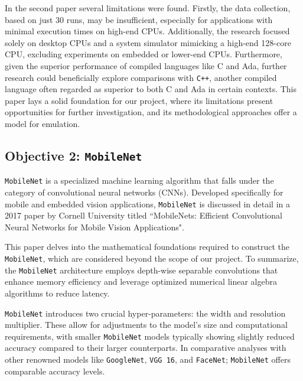 In the second paper\cite{mpbenchmark_paper} several limitations were found. Firstly, the data collection, based on just 30 runs, may be insufficient, especially for applications with minimal execution times on high-end CPUs. Additionally, the research focused solely on desktop CPUs and a system simulator mimicking a high-end 128-core CPU, excluding experiments on embedded or lower-end CPUs. Furthermore, given the superior performance of compiled languages like C and Ada, further research could beneficially explore comparisons with \texttt{C++}, another compiled language often regarded as superior to both C and Ada in certain contexts. This paper lays a solid foundation for our project, where its limitations present opportunities for further investigation, and its methodological approaches offer a model for emulation.

\subsection{Objective 2: \texttt{MobileNet}}

\texttt{MobileNet} is a specialized machine learning algorithm that falls under the category of convolutional neural networks (CNNs). Developed specifically for mobile and embedded vision applications, \texttt{MobileNet} is discussed in detail in a 2017 paper by Cornell University titled ``MobileNets: Efficient Convolutional Neural Networks for Mobile Vision Applications"\cite{mobilenet_paper}. 

This paper\cite{mobilenet_paper} delves into the mathematical foundations required to construct the \texttt{MobileNet}, which are considered beyond the scope of our project. To summarize, the \texttt{MobileNet} architecture employs depth-wise separable convolutions that enhance memory efficiency and leverage optimized numerical linear algebra algorithms to reduce latency.

\texttt{MobileNet} introduces two crucial hyper-parameters: the width and resolution multiplier. These allow for adjustments to the model's size and computational requirements, with smaller \texttt{MobileNet} models typically showing slightly reduced accuracy compared to their larger counterparts. In comparative analyses with other renowned models like \texttt{GoogleNet}, \texttt{VGG 16}, and \texttt{FaceNet}; \texttt{MobileNet} offers comparable accuracy levels.

